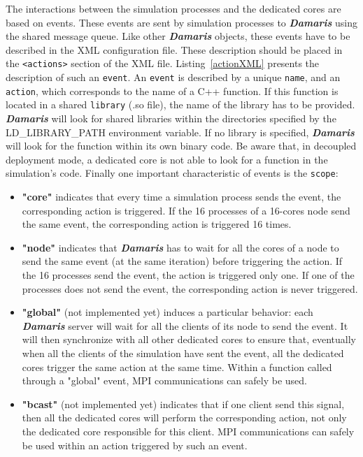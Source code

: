 \documentclass[11pt]{report}
\newcommand{\Damaris}{\emph{\textbf{Damaris}}}
\begin{document}
The interactions between the simulation processes and the dedicated cores are based on events.
These events are sent by simulation processes to \Damaris{} using the shared message queue.
Like other \Damaris{} objects, these events have to be described in the XML configuration file.
These description should be placed in the \texttt{<actions>} section of the XML file.
Listing~\ref{actionXML} presents the description of such an \texttt{event}.
An \texttt{event} is described by a unique \texttt{name}, and an \texttt{action}, which corresponds to
the name of a C++ function. If this function is located in a shared \texttt{library} (.so file), the name
of the library has to be provided. \Damaris{} will look for shared libraries within the directories
specified by the LD\_LIBRARY\_PATH environment variable. If no library is specified, \Damaris{}
will look for the function within its own binary code. Be aware that, in decoupled deployment mode,
a dedicated core is not able to look for a function in the simulation's code.
Finally one important characteristic of events is the \texttt{scope}:
\begin{itemize}
	\item \textbf{"core"} indicates that every time a simulation process sends the event, the
	corresponding action is triggered. If the 16 processes of a 16-cores node 
	send the same event, the corresponding action is triggered 16 times.
	\item \textbf{"node"} indicates that \Damaris{} has to wait for all the cores of a node to send
	the same event (at the same iteration) before triggering the action. If the 16 processes
	send the event, the action is triggered only one. If one of the processes does not send the
	event, the corresponding action is never triggered.
	\item \textbf{"global"} (not implemented yet) induces a particular behavior: each \Damaris{} 
	server will wait for all the clients of its node to send the event. It will then synchronize with
	all other dedicated cores to ensure that, eventually when all the clients of the simulation
	have sent the event, all the dedicated cores trigger the same action at the same time.
	Within a function called through a "global" event, MPI communications can safely be used.
	\item \textbf{"bcast"} (not implemented yet) indicates that if one client send this signal, then all the dedicated
	cores will perform the corresponding action, not only the dedicated core responsible for this
	client. MPI communications can safely be used within an action triggered by such an event.
\end{itemize}
\end{document}
